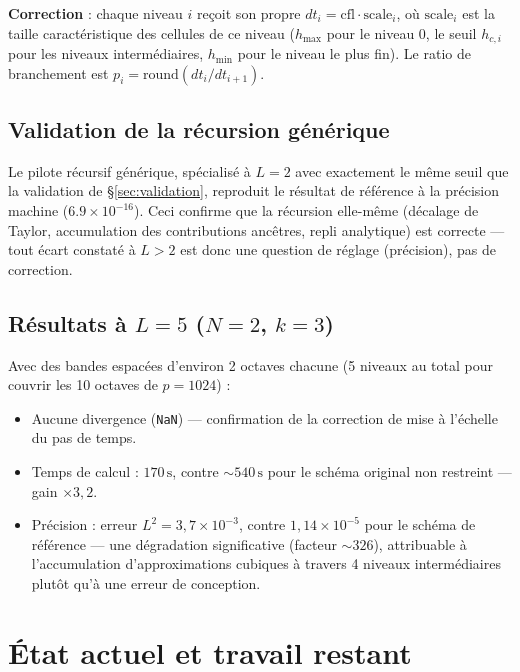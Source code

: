 \documentclass[11pt]{article}
\newcommand{\code}[1]{\texttt{#1}}
\begin{document}
\textbf{Correction} : chaque niveau $i$ reçoit son propre $dt_i =
\mathrm{cfl} \cdot \mathrm{scale}_i$, où $\mathrm{scale}_i$ est la taille
caractéristique des cellules de ce niveau ($h_{\max}$ pour le niveau 0,
le seuil $h_{c,i}$ pour les niveaux intermédiaires, $h_{\min}$ pour le
niveau le plus fin). Le ratio de branchement est $p_i = \mathrm{round}
(dt_i / dt_{i+1})$.

\subsection{Validation de la récursion générique}

Le pilote récursif générique, spécialisé à $L=2$ avec exactement le même
seuil que la validation de \S\ref{sec:validation}, reproduit le résultat
de référence à la précision machine ($6.9\times 10^{-16}$). Ceci confirme
que la récursion elle-même (décalage de Taylor, accumulation des
contributions ancêtres, repli analytique) est correcte --- tout écart
constaté à $L>2$ est donc une question de réglage (précision), pas de
correction.

\subsection{Résultats à $L=5$ ($N=2$, $k=3$)}

Avec des bandes espacées d'environ 2 octaves chacune (5 niveaux au total
pour couvrir les 10 octaves de $p=1024$) :
\begin{itemize}
  \item Aucune divergence (\code{NaN}) --- confirmation de la correction
  de mise à l'échelle du pas de temps.
  \item Temps de calcul : $170\,\mathrm{s}$, contre $\sim 540\,\mathrm{s}$
  pour le schéma original non restreint --- gain $\times 3{,}2$.
  \item Précision : erreur $L^2 = 3{,}7\times 10^{-3}$, contre
  $1{,}14\times 10^{-5}$ pour le schéma de référence --- une dégradation
  significative (facteur $\sim 326$), attribuable à l'accumulation
  d'approximations cubiques à travers 4 niveaux intermédiaires plutôt qu'à
  une erreur de conception.
\end{itemize}

\section{État actuel et travail restant}
\end{document}
